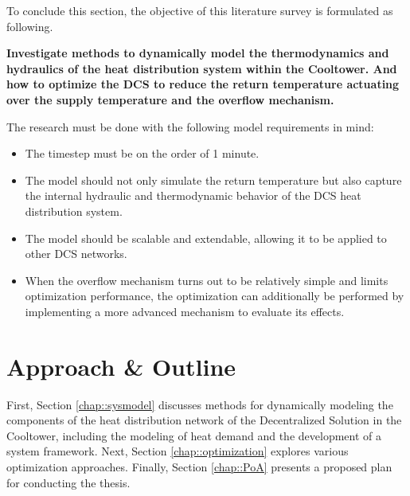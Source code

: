 To conclude this section, the objective of this literature survey is formulated as following.

{\centering
\textbf{Investigate methods to dynamically model the thermodynamics and hydraulics of the heat distribution system within the Cooltower. And how to optimize the DCS to reduce the return temperature actuating over the supply temperature and the overflow mechanism.}\par
}
The research must be done with the following model requirements in mind:

\begin{itemize}
    \item The timestep must be on the order of 1 minute. 
    \item The model should not only simulate the return temperature but also capture the internal hydraulic and thermodynamic behavior of the DCS heat distribution system.
    \item The model should be scalable and extendable, allowing it to be applied to other DCS networks.
    \item When the overflow mechanism turns out to be relatively simple and limits optimization performance, the optimization can additionally be performed by implementing a more advanced mechanism to evaluate its effects.
\end{itemize}

\section{Approach \& Outline}
First, Section \ref{chap::sysmodel} discusses methods for dynamically modeling the components of the heat distribution network of the Decentralized Solution in the Cooltower, including the modeling of heat demand and the development of a system framework. Next, Section \ref{chap::optimization} explores various optimization approaches. Finally, Section \ref{chap::PoA} presents a proposed plan for conducting the thesis.



